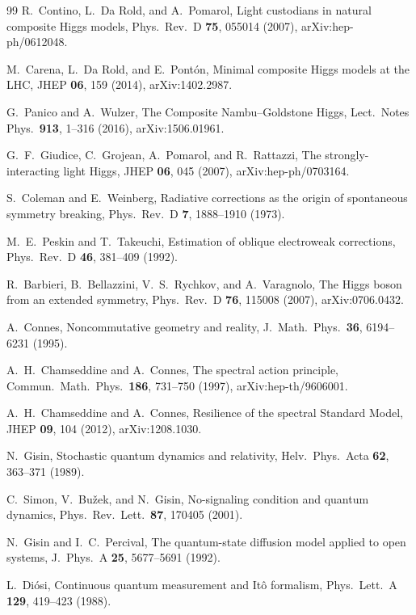 \documentclass[aps,pra,onecolumn,superscriptaddress,nofootinbib,10pt]{revtex4-2}
\theoremstyle{definition}
\theoremstyle{remark}
\begin{document}
\begin{thebibliography}{99}
 R.~Contino, L.~Da Rold, and A.~Pomarol, Light custodians in natural composite Higgs models, Phys.\ Rev.\ D \textbf{75}, 055014 (2007), arXiv:hep-ph/0612048.

 M.~Carena, L.~Da Rold, and E.~Pont\'on, Minimal composite Higgs models at the LHC, JHEP \textbf{06}, 159 (2014), arXiv:1402.2987.

 G.~Panico and A.~Wulzer, The Composite Nambu--Goldstone Higgs, Lect.\ Notes Phys.\ \textbf{913}, 1--316 (2016), arXiv:1506.01961.

 G.~F.~Giudice, C.~Grojean, A.~Pomarol, and R.~Rattazzi, The strongly-interacting light Higgs, JHEP \textbf{06}, 045 (2007), arXiv:hep-ph/0703164.

 S.~Coleman and E.~Weinberg, Radiative corrections as the origin of spontaneous symmetry breaking, Phys.\ Rev.\ D \textbf{7}, 1888--1910 (1973).

 M.~E.~Peskin and T.~Takeuchi, Estimation of oblique electroweak corrections, Phys.\ Rev.\ D \textbf{46}, 381--409 (1992).

 R.~Barbieri, B.~Bellazzini, V.~S.~Rychkov, and A.~Varagnolo, The Higgs boson from an extended symmetry, Phys.\ Rev.\ D \textbf{76}, 115008 (2007), arXiv:0706.0432.

 A.~Connes, Noncommutative geometry and reality, J.\ Math.\ Phys.\ \textbf{36}, 6194--6231 (1995).

 A.~H.~Chamseddine and A.~Connes, The spectral action principle, Commun.\ Math.\ Phys.\ \textbf{186}, 731--750 (1997), arXiv:hep-th/9606001.

 A.~H.~Chamseddine and A.~Connes, Resilience of the spectral Standard Model, JHEP \textbf{09}, 104 (2012), arXiv:1208.1030.

 N.~Gisin, Stochastic quantum dynamics and relativity, Helv.\ Phys.\ Acta \textbf{62}, 363--371 (1989).

 C.~Simon, V.~Bu\v{z}ek, and N.~Gisin, No-signaling condition and quantum dynamics, Phys.\ Rev.\ Lett.\ \textbf{87}, 170405 (2001).

 N.~Gisin and I.~C.~Percival, The quantum-state diffusion model applied to open systems, J.\ Phys.\ A \textbf{25}, 5677--5691 (1992).

 L.~Di\'osi, Continuous quantum measurement and It\^o formalism, Phys.\ Lett.\ A \textbf{129}, 419--423 (1988).


\end{thebibliography}
\end{document}
